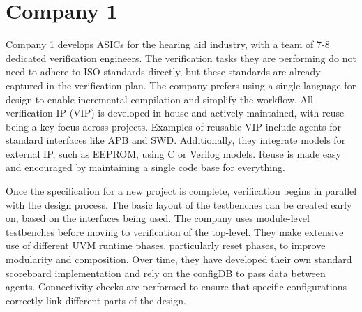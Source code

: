\documentclass[11pt,a4paper]{report}
\begin{document}

\section{Company 1} %

Company 1 develops ASICs for the hearing aid industry, with a team of 7-8 dedicated verification engineers. The
verification tasks they are performing do not need to adhere to ISO standards directly, but these standards are
already captured in the verification plan. The company prefers using a single language for design to enable
incremental compilation and simplify the workflow. All verification IP (VIP) is developed in-house and actively
maintained, with reuse being a key focus across projects. Examples of reusable VIP include agents for standard interfaces like
APB and SWD. Additionally, they integrate models for external IP, such as EEPROM, using C or Verilog models. Reuse is
made easy and encouraged by maintaining a single code base for everything.

Once the specification for a new project is complete, verification begins in parallel with the design process. The
basic layout of the testbenches can be created early on, based on the interfaces being used. The company uses
module-level testbenches before moving to verification of the top-level. They make extensive use of different UVM
runtime phases, particularly reset phases, to improve modularity and composition. Over time, they have developed
their own standard scoreboard implementation and rely on the configDB to pass data between agents. Connectivity
checks are performed to ensure that specific configurations correctly link different parts of the design.
\end{document}
